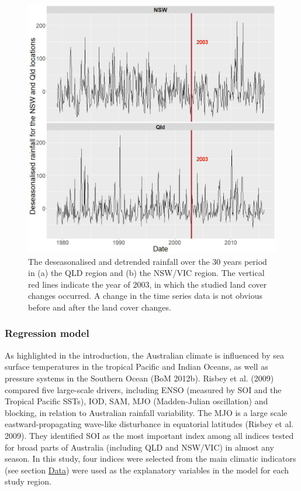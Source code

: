 \documentclass[]{elsarticle} %
\theoremstyle{definition}
\theoremstyle{definition}
\theoremstyle{definition}
\theoremstyle{remark}
\begin{document}
\begin{figure}
\includegraphics[width=0.9\linewidth]{figures/Rainfall_resid} \caption{The deseasonalised and detrended rainfall over the 30 years period in (a) the QLD region and (b) the NSW/VIC region. The vertical red lines indicate the year of 2003, in which the studied land cover changes occurred. A change in the time series data is not obvious before and after the land cover changes.}\label{fig:ts-mean}
\end{figure}

\subsubsection{Regression model}\label{reg_model}

As highlighted in the introduction, the Australian climate is influenced
by sea surface temperatures in the tropical Pacific and Indian Oceans,
as well as pressure systems in the Southern Ocean (BoM 2012b). Risbey et
al. (2009) compared five large-scale drivers, including ENSO (measured
by SOI and the Tropical Pacific SSTs), IOD, SAM, MJO (Madden-Julian
oscillation) and blocking, in relation to Australian rainfall
variability. The MJO is a large scale eastward-propagating wave-like
disturbance in equatorial latitudes (Risbey et al. 2009). They
identified SOI as the most important index among all indices tested for
broad parts of Australia (including QLD and NSW/VIC) in almost any
season. In this study, four indices were selected from the main climatic
indicators (see section \protect\hyperlink{Data}{Data}) were used as the
explanatory variables in the model for each study region.
\end{document}
